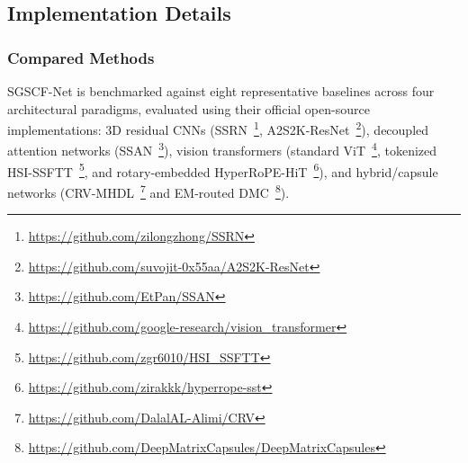 \documentclass[manuscript,screen,review]{acmart}
\begin{document}
\subsection{Implementation Details}
\label{subsec:implementation}

\subsubsection{Compared Methods}
SGSCF-Net is benchmarked against eight representative baselines across four architectural paradigms, evaluated using their official open-source implementations: 3D residual CNNs (SSRN~\cite{zhong2017spectral}\footnote{\url{https://github.com/zilongzhong/SSRN}}, A2S2K-ResNet~\cite{roy2020attention}\footnote{\url{https://github.com/suvojit-0x55aa/A2S2K-ResNet}}), decoupled attention networks (SSAN~\cite{sun2019spectral}\footnote{\url{https://github.com/EtPan/SSAN}}), vision transformers (standard ViT~\cite{dosovitskiy2020image}\footnote{\url{https://github.com/google-research/vision_transformer}}, tokenized HSI-SSFTT~\cite{sun2022spectral}\footnote{\url{https://github.com/zgr6010/HSI_SSFTT}}, and rotary-embedded HyperRoPE-HiT~\cite{khan2025hyperrope}\footnote{\url{https://github.com/zirakkk/hyperrope-sst}}), and hybrid/capsule networks (CRV-MHDL~\cite{alalimi2022compression}\footnote{\url{https://github.com/DalalAL-Alimi/CRV}} and EM-routed DMC~\cite{wang2021deep}\footnote{\url{https://github.com/DeepMatrixCapsules/DeepMatrixCapsules}}).
\end{document}
